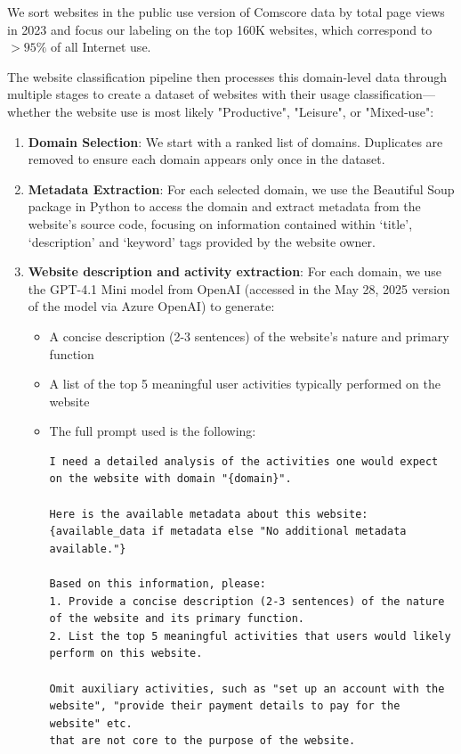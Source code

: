 \documentclass[12pt]{article}
\begin{document}
We sort websites in the public use version of Comscore data by total  page views in 2023 and focus our labeling on the top 160K websites, which correspond to $>95\%$ of all Internet use.

The website classification pipeline then processes this domain-level data through multiple stages to create a dataset of websites with their usage classification---whether the website use is most likely "Productive", "Leisure", or "Mixed-use":
\begin{enumerate}
    \item \textbf{Domain Selection}: We start with a ranked list of domains.  Duplicates are removed to ensure each domain appears only once in the dataset.
    
    \item \textbf{Metadata Extraction}: For each selected domain, we use the Beautiful Soup package in Python to access the domain and extract metadata from the website's source code, focusing on information contained within `title', `description' and `keyword' tags provided by the website owner.

    \item \textbf{Website description and activity extraction}: For each domain, we use the GPT-4.1 Mini model from OpenAI  (accessed in the May 28, 2025 version of the model via Azure OpenAI) to generate:
    \begin{itemize}
        \item A concise description (2-3 sentences) of the website's nature and primary function
        \item A list of the top 5 meaningful user activities typically performed on the website
        \item The full prompt used is the following: \tiny
\begin{verbatim} 
I need a detailed analysis of the activities one would expect on the website with domain "{domain}".

Here is the available metadata about this website:
{available_data if metadata else "No additional metadata available."}

Based on this information, please:
1. Provide a concise description (2-3 sentences) of the nature of the website and its primary function.
2. List the top 5 meaningful activities that users would likely perform on this website.

Omit auxiliary activities, such as "set up an account with the website", "provide their payment details to pay for the website" etc.
that are not core to the purpose of the website.


\end{verbatim}
\end{itemize}
\end{enumerate}
\end{document}

